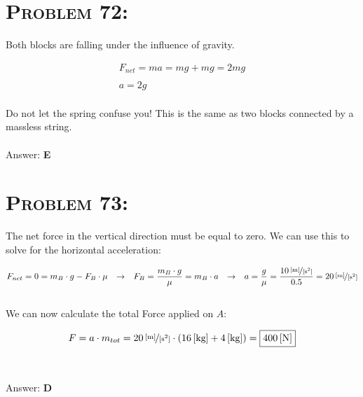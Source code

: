 \documentclass{article}
\begin{document}

\section{\textsc{Problem 72:}} Both blocks are falling under the influence of gravity.

\begin{gather}
F_{net} = ma = mg + mg = 2 m g\nonumber\\
\nonumber\\
\boxed{a = 2g}\nonumber
\end{gather}
\\
Do not let the spring confuse you! This is the same as two blocks connected by a massless string.
\\\\
Answer: \textbf{\textcolor{ProcessBlue}E}\\


\section{\textsc{Problem 73:}} The net force in the vertical direction must be equal to zero. We can use this to solve for the horizontal acceleration:

\begin{gather}
F_{net} = 0 = m_{B}\cdot g - F_{B} \cdot \mu \hspace{.1in} \rightarrow \hspace{.1in} F_{B} = \frac{m_{B}\cdot g}{\mu} = m_{B} \cdot a  \hspace{.1in} \rightarrow \hspace{.1in} a = \frac{g}{\mu} =\frac{\unitfrac[10]{[m]}{[s^{2}]}}{0.5} = \unitfrac[20]{[m]}{[s^{2}]}\nonumber
\end{gather}
\\
We can now calculate the total Force applied on $A$:

\begin{gather}
F = a \cdot m_{tot}  = \unitfrac[20]{[m]}{[s^{2}]} \cdot (\unit[16]{[kg]} + \unit[4]{[kg]})  = \boxed{\unit[400]{[N]}}\nonumber
\end{gather}
\\\\
Answer: \textbf{\textcolor{ProcessBlue}D}\\

\end{document}

